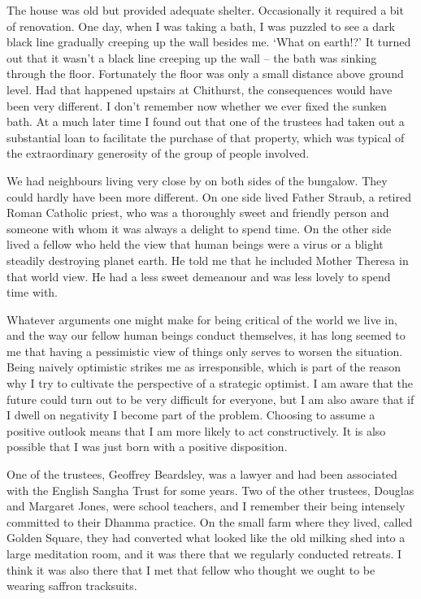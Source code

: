The house was old but provided adequate shelter. Occasionally it
required a bit of renovation. One day, when I was taking a bath, I was
puzzled to see a dark black line gradually creeping up the wall besides
me. `What on earth!?' It turned out that it wasn't a black line creeping
up the wall -- the bath was sinking through the floor. Fortunately the
floor was only a small distance above ground level. Had that happened
upstairs at Chithurst, the consequences would have been very different.
I don't remember now whether we ever fixed the sunken bath. At a much
later time I found out that one of the trustees had taken out a
substantial loan to facilitate the purchase of that property, which was
typical of the extraordinary generosity of the group of people involved.

We had neighbours living very close by on both sides of the bungalow.
They could hardly have been more different. On one side lived Father
Straub, a retired Roman Catholic priest, who was a thoroughly sweet and
friendly person and someone with whom it was always a delight to spend
time. On the other side lived a fellow who held the view that human
beings were a virus or a blight steadily destroying planet earth. He
told me that he included Mother Theresa in that world view. He had a
less sweet demeanour and was less lovely to spend time with.

Whatever arguments one might make for being critical of the world we
live in, and the way our fellow human beings conduct themselves, it has
long seemed to me that having a pessimistic view of things only serves
to worsen the situation. Being naively optimistic strikes me as
irresponsible, which is part of the reason why I try to cultivate the
perspective of a strategic optimist. I am aware that the future could
turn out to be very difficult for everyone, but I am also aware that if
I dwell on negativity I become part of the problem. Choosing to assume a
positive outlook means that I am more likely to act constructively. It
is also possible that I was just born with a positive disposition.

One of the trustees, Geoffrey Beardsley, was a lawyer and had been
associated with the English Sangha Trust for some years. Two of the
other trustees, Douglas and Margaret Jones, were school teachers, and I
remember their being intensely committed to their Dhamma practice. On
the small farm where they lived, called Golden Square, they had
converted what looked like the old milking shed into a large meditation
room, and it was there that we regularly conducted retreats. I think it
was also there that I met that fellow who thought we ought to be wearing
saffron tracksuits.

